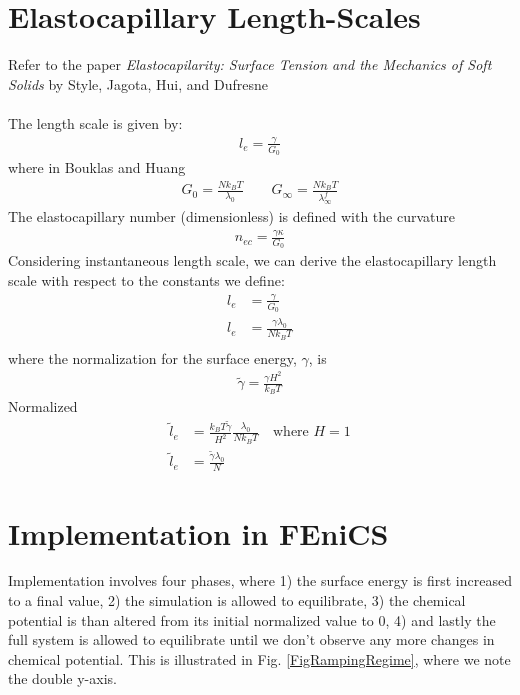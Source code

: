 \documentclass[12pt,3p]{article}
\numberwithin{equation}{section}
\begin{document}
\section{Elastocapillary Length-Scales}
\vspace{-2ex}
Refer to the paper \textit{Elastocapilarity: Surface Tension and the Mechanics of Soft Solids} by Style, Jagota, Hui, and Dufresne \\ \\
The length scale is given by:
\begin{align}\label{elastocapLengthScale}
l_e = \frac{\gamma}{G_0} 
\end{align}
where in Bouklas and Huang 
\begin{align*}
G_0 = \frac{N k_B T}{\lambda_0} \quad \quad G_\infty = \frac{N k_B T}{\lambda_{\infty}^f}
\end{align*}
The elastocapillary number (dimensionless) is defined with the curvature
\begin{align}
n_{ec} = \frac{\gamma \kappa}{G_0}
\end{align}
Considering instantaneous length scale, we can derive the elastocapillary length scale with respect to the constants we define:
\begin{align*}
l_e &= \frac{\gamma}{G_0} \\
l_e &= \frac{\gamma \lambda_0}{N k_B T} \\
\end{align*}
where the normalization for the surface energy, $\gamma$, is 
\begin{align*}
\tilde{\gamma} = \frac{\gamma H^2}{k_B T}
\end{align*}
Normalized 
\begin{align*}
\tilde{l}_e &= \frac{k_B T \tilde{\gamma}}{H^2} \frac{\lambda_0}{N k_B T} \quad \text{where } H = 1 \\
\tilde{l}_e &= \frac{\tilde{\gamma} \lambda_0}{N}
\end{align*}

\newpage
\section{Implementation in FEniCS}
\vspace{-2ex}
Implementation involves four phases, where 1) the surface energy is first increased to a final value, 2) the simulation is allowed to equilibrate, 3) the chemical potential is than altered from its initial normalized value to 0, 4) and lastly the full system is allowed to equilibrate until we don't observe any more changes in chemical potential. This is illustrated in Fig. \ref{FigRampingRegime}, where we note the double y-axis. 
\end{document}
